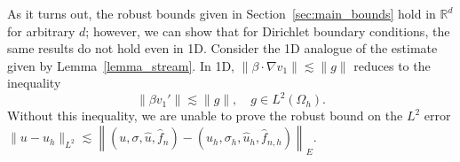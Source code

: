 \documentclass[11pt,onecolumn]{scrartcl}
\newcommand{\eqnref}[1]{\eqref{eq:#1}}
\newcommand{\nor}[1]{\left\| #1 \right\|}
\newcommand{\LRs}[1]{\left[ #1 \right]}
\newcommand{\LRa}[1]{\left\langle #1 \right\rangle}
\newcommand{\jump}[1] {\ensuremath{\LRs{\![#1]\!}}}
\newcommand{\Gh}{\Gamma_h}
\newcommand{\Oh}{\Omega_h}
\newcommand{\grad}{\nabla}
\renewcommand{\div}{\grad \cdot}
\begin{document}
As it turns out, the robust bounds given in Section~\ref{sec:main_bounds} hold in $\mathbb{R}^d$ for arbitrary $d$; however, we can show that for Dirichlet boundary conditions, the same results do not hold even in 1D.  
%
Consider the 1D analogue of the estimate given by Lemma~\ref{lemma_stream}.  In 1D, $\|\beta\cdot\grad v_1\| \lesssim \|g\|$ reduces to the inequality 
\[
\|\beta v_1'\|\lesssim \|g\|, \quad g\in L^2\!\left(\Oh\right).
\]
Without this inequality, we are unable to prove the robust bound on the $L^2$ error $\|u-u_h\|_{L^2} \lesssim \nor{(u,\sigma,\widehat{u},\widehat{f}_n)-(u_h,\sigma_h,\widehat{u}_h,\widehat{f}_{n,h})}_E$.
\end{document}
